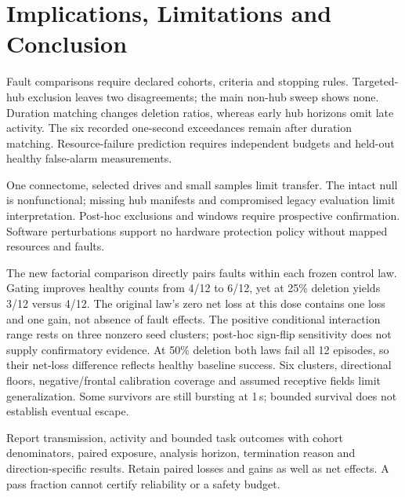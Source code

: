 \section{Implications, Limitations and Conclusion}
Fault comparisons require declared cohorts, criteria and stopping rules. Targeted-hub exclusion leaves two disagreements; the main non-hub sweep shows none. Duration matching changes deletion ratios, whereas early hub horizons omit late activity. The six recorded one-second exceedances remain after duration matching. Resource-failure prediction requires independent budgets and held-out healthy false-alarm measurements.

One connectome, selected drives and small samples limit transfer. The intact null is nonfunctional; missing hub manifests and compromised legacy evaluation limit interpretation. Post-hoc exclusions and windows require prospective confirmation. Software perturbations support no hardware protection policy without mapped resources and faults.

The new factorial comparison directly pairs faults within each frozen control law. Gating improves healthy counts from 4/12 to 6/12, yet at 25\% deletion yields 3/12 versus 4/12. The original law's zero net loss at this dose contains one loss and one gain, not absence of fault effects. The positive conditional interaction range rests on three nonzero seed clusters; post-hoc sign-flip sensitivity does not supply confirmatory evidence. At 50\% deletion both laws fail all 12 episodes, so their net-loss difference reflects healthy baseline success. Six clusters, directional floors, negative/frontal calibration coverage and assumed receptive fields limit generalization. Some survivors are still bursting at 1\,s; bounded survival does not establish eventual escape.

Report transmission, activity and bounded task outcomes with cohort denominators, paired exposure, analysis horizon, termination reason and direction-specific results. Retain paired losses and gains as well as net effects. A pass fraction cannot certify reliability or a safety budget.
